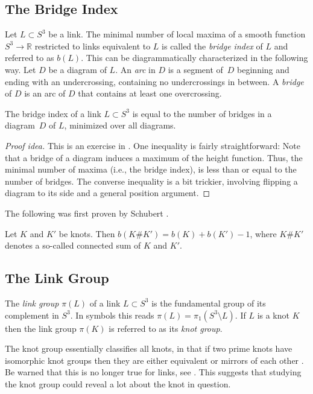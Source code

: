 \documentclass[main.tex]{subfiles}
\begin{document}
\subsection{The Bridge Index} \label{subsec:bridge-index}
Let $L \subset S^3$ be a link. The minimal number of local maxima of a smooth function $S^3 \rightarrow \mathbb{R}$ restricted to links equivalent to $L$ is called the \textit{bridge index} of $L$ and referred to as $b(L)$.
This can be diagrammatically characterized in the following way. Let $D$ be a diagram of $L$. An \textit{arc} in $D$ is a segment of~$D$ beginning and ending with an undercrossing, containing no undercrossings in between. A \textit{bridge} of $D$ is an arc of $D$ that contains at least one overcrossing.

\begin{proposition}
The bridge index of a link $L \subset S^3$ is equal to the number of bridges in a diagram~$D$ of $L$, minimized over all diagrams.
\end{proposition}

\begin{proof}[Proof idea]
This is an exercise in \cite{rolfsen2003}. One inequality is fairly straightforward:
Note that a bridge of a diagram induces a maximum of the height function. Thus, the minimal number of maxima (i.e., the bridge index), is less than or equal to the number of bridges. The converse inequality is a bit trickier, involving flipping a diagram to its side and a general position argument.
\end{proof}

The following was first proven by Schubert \cite{schubert1954}.

\begin{proposition}\label{prop:bridge-index-connected-sum}
Let $K$ and $K'$ be knots. Then $b(K\#K') = b( K ) + b(K') - 1$, where $K \# K'$ denotes a so-called connected sum of $K$ and $K'$.
\end{proposition}


\subsection{The Link Group}\label{subsec:link-group}
The \textit{link group} $\pi(L)$ of a link $L \subset S^3$ is the fundamental group of its complement in $S^3$. In symbols this reads $\pi(L) = \pi_1(S^3 \setminus L)$. If $L$ is a knot $K$ then the link group $\pi(K)$ is referred to as its \textit{knot group}.

The knot group essentially classifies all knots, in that if two prime knots have isomorphic knot groups then they are either equivalent or mirrors of each other \cite{gordon1989}. Be warned that this is no longer true for links, see \cite{rolfsen2003}. This suggests that studying the knot group could reveal a lot about the knot in question.
\end{document}

